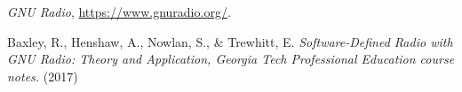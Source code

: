 

%
%
%
\begin{thebibliography}{1}

\emph{GNU Radio}, \url{https://www.gnuradio.org/}.

Baxley, R., Henshaw, A., Nowlan, S., \& Trewhitt, E. \emph{Software-Defined Radio with GNU Radio: Theory and Application, Georgia Tech Professional Education course notes.} (2017)

\end{thebibliography}








